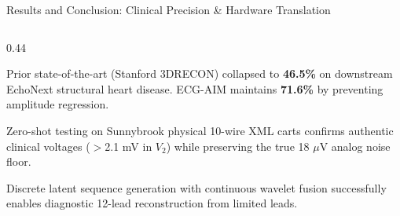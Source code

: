 \documentclass[aspectratio=169,10pt]{beamer}
\begin{document}
\begin{frame}{Results and Conclusion: Clinical Precision \& Hardware Translation}
\begin{columns}[T]
\begin{column}{0.44\textwidth}
\begin{tcolorbox}[cardstyle,colframe=AlertRed,title={\bfseries\color{AlertRed}2. Overcoming Diagnostic Collapse}]
        \fontsize{7.5}{9.5}\selectfont
        Prior state-of-the-art (Stanford 3DRECON) collapsed to \textbf{46.5\%} on downstream EchoNext structural heart disease. ECG-AIM maintains \textbf{71.6\%} by preventing amplitude regression.
      \end{tcolorbox}
      \vskip 2pt
      \begin{tcolorbox}[cardstyle,colframe=Navy,title={\bfseries\color{Navy}3. Hospital Cart Hardware Validation}]
        \fontsize{7.5}{9.5}\selectfont
        Zero-shot testing on Sunnybrook physical 10-wire XML carts confirms authentic clinical voltages ($>$2.1 mV in $V_2$) while preserving the true 18 $\mu$V analog noise floor.
      \end{tcolorbox}
      \vskip 2pt
      \begin{tcolorbox}[cardstyle,colframe=CyanAccent,title={\bfseries\color{CyanAccent}4. Study Conclusion}]
        \fontsize{7.5}{9.5}\selectfont
        Discrete latent sequence generation with continuous wavelet fusion successfully enables diagnostic 12-lead reconstruction from limited leads.
      \end{tcolorbox}
    \end{column}
  \end{columns}
\end{frame}
\end{document}

